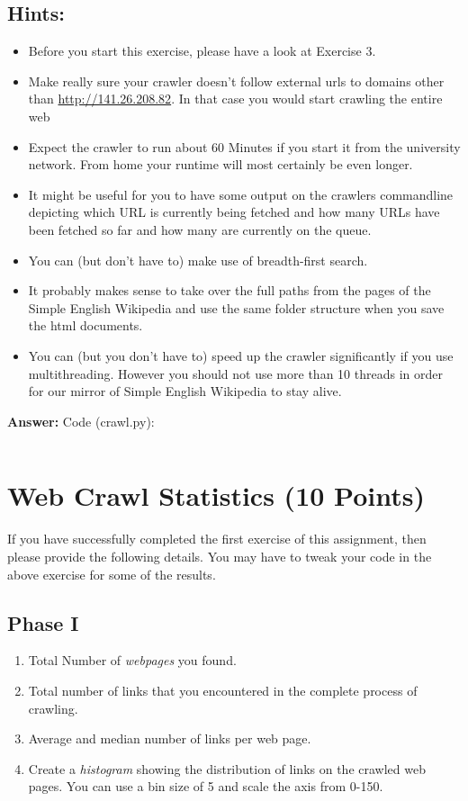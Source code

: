 \documentclass{WeSTassignment}
\begin{document}
\subsection{Hints:}
\begin{itemize}
\item Before you start this exercise, please have a look at Exercise 3. 
\item Make really sure your crawler doesn't follow external urls to domains other than \mbox{\url{http://141.26.208.82}}. In that case you would start crawling the entire web
\item Expect the crawler to run about 60 Minutes if you start it from the university network. From home your runtime will most certainly be even longer.
\item It might be useful for you to have some output on the crawlers commandline depicting which URL is currently being fetched and how many URLs have been fetched so far and how many are currently on the queue.
\item You can (but don't have to) make use of breadth-first search.
\item It probably makes sense to take over the full paths from the pages of the Simple English Wikipedia and use the same folder structure when you save the html documents.
\item You can (but you don't have to) speed up the crawler significantly if you use multithreading. However you should not use more than 10 threads in order for our mirror of Simple English Wikipedia to stay alive. 
\end{itemize}

\textbf{Answer:} 
Code (crawl.py): \\ 
\begin{lstlisting}
\end{lstlisting}

\section{Web Crawl Statistics (10 Points)}

If you have successfully completed the first exercise of this assignment, then please provide the following details. You may have to tweak your code in the above exercise for some of the results. 
\subsection{Phase I}
\begin{enumerate}
\item Total Number of \emph{webpages} you found.
\item Total number of links that you encountered in the complete process of crawling.
\item Average and median number of links per web page.
\item Create a \emph{histogram} showing the distribution of links on the crawled web pages. You can use a bin size of 5 and scale the axis from 0-150.
\end{enumerate}
\end{document}
